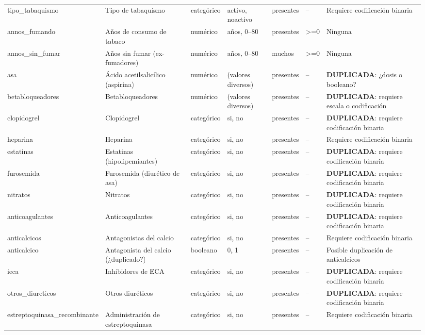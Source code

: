 \documentclass[11pt,a4paper]{article}
\begin{document}
\begin{longtable}{@{}L{0.095\textwidth} L{0.17\textwidth} L{0.07\textwidth} L{0.16\textwidth} L{0.14\textwidth} L{0.13\textwidth} L{0.15\textwidth}@{}}
tipo\_tabaquismo & Tipo de tabaquismo & categórico & activo, noactivo & presentes & -- & Requiere codificación binaria \\
annos\_fumando & Años de consumo de tabaco & numérico & años, 0--80 & presentes & >=0 & Ninguna \\
annos\_sin\_fumar & Años sin fumar (ex-fumadores) & numérico & años, 0--80 & muchos & >=0 & Ninguna \\
asa & Ácido acetilsalicílico (aspirina) & numérico & (valores diversos) & presentes & -- & \textbf{DUPLICADA}: ¿dosis o booleano? \\
betabloqueadores & Betabloqueadores & numérico & (valores diversos) & presentes & -- & \textbf{DUPLICADA}: requiere escala o codificación \\
clopidogrel & Clopidogrel & categórico & si, no & presentes & -- & \textbf{DUPLICADA}: requiere codificación binaria \\
heparina & Heparina & categórico & si, no & presentes & -- & Requiere codificación binaria \\
estatinas & Estatinas (hipolipemiantes) & categórico & si, no & presentes & -- & \textbf{DUPLICADA}: requiere codificación binaria \\
furosemida & Furosemida (diurético de asa) & categórico & si, no & presentes & -- & \textbf{DUPLICADA}: requiere codificación binaria \\
nitratos & Nitratos & categórico & si, no & presentes & -- & \textbf{DUPLICADA}: requiere codificación binaria \\
anticoagulantes & Anticoagulantes & categórico & si, no & presentes & -- & \textbf{DUPLICADA}: requiere codificación binaria \\
anticalcicos & Antagonistas del calcio & categórico & si, no & presentes & -- & Requiere codificación binaria \\
anticalcico & Antagonista del calcio (¿duplicado?) & booleano & 0, 1 & presentes & -- & Posible duplicación de anticalcicos \\
ieca & Inhibidores de ECA & categórico & si, no & presentes & -- & \textbf{DUPLICADA}: requiere codificación binaria \\
otros\_diureticos & Otros diuréticos & categórico & si, no & presentes & -- & \textbf{DUPLICADA}: requiere codificación binaria \\
estreptoquinasa\_recombinante & Administración de estreptoquinasa & categórico & si, no & presentes & -- & Requiere codificación binaria \\

\end{longtable}
\end{document}
